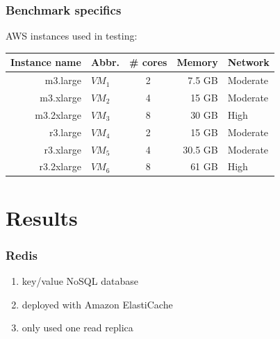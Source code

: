 \documentclass{beamer}
\begin{document}
\begin{frame}
\frametitle{Benchmark specifics}
AWS instances used in testing:
\begin{table}
\begin{tabular}{|r|l|c|r|l|} \hline
Instance name & Abbr.& \# cores&Memory&Network\\ \hline
m3.large & $VM_1$ & 2 & 7.5 GB & Moderate\\ \hline
m3.xlarge & $VM_2$ & 4 & 15 GB & Moderate\\ \hline
m3.2xlarge & $VM_3$ & 8 & 30 GB & High\\ \hline
r3.large & $VM_4$ & 2 & 15 GB & Moderate\\ \hline
r3.xlarge & $VM_5$ & 4 & 30.5 GB & Moderate\\ \hline
r3.2xlarge & $VM_6$ & 8 & 61 GB & High\\ \hline
\hline\end{tabular}
\end{table}
\end{frame}

\section{Results}

\begin{frame}
\frametitle{Redis}
\begin{enumerate}
\item key/value NoSQL database
\item deployed with Amazon ElastiCache
\item only used one read replica
\end{enumerate}
\end{frame}
\end{document}
